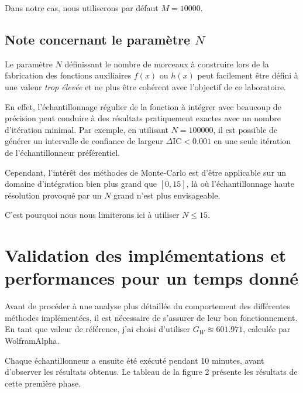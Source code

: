 \documentclass[a4paper,11pt]{article}
\begin{document}
Dans notre cas, nous utiliserons par défaut $M=10000$.

\subsection{Note concernant le paramètre $N$}

Le paramètre $N$ définissant le nombre de morceaux à construire lors de la fabrication des fonctions auxiliaires $f(x)$ ou $h(x)$ peut facilement être défini à une valeur \emph{trop élevée} et ne plus être cohérent avec l'objectif de ce laboratoire.

En effet, l'échantillonnage régulier de la fonction à intégrer avec beaucoup de précision peut conduire à des résultats pratiquement exactes avec un nombre d'itération minimal. Par exemple, en utilisant $N=100000$, il est possible de générer un intervalle de confiance de largeur $\Delta\text{IC} < 0.001$ en une seule itération de l'échantillonneur préférentiel.

Cependant, l'intérêt des méthodes de Monte-Carlo est d'être applicable sur un domaine d'intégration bien plus grand que $[0,15]$, là où l'échantillonnage haute résolution provoqué par un $N$ grand n'est plus envisageable.

C'est pourquoi nous nous limiterons ici à utiliser $N \le 15$.

\section{Validation des implémentations et performances pour un temps donné}

Avant de procéder à une analyse plus détaillée du comportement des différentes méthodes implémentées, il est nécessaire de s'assurer de leur bon fonctionnement. En tant que valeur de référence, j'ai choisi d'utiliser $G_W \approxeq 601.971$, calculée par WolframAlpha.

Chaque échantillonneur a ensuite été exécuté pendant 10 minutes, avant d'observer les résultats obtenus.
Le tableau de la figure 2 présente les résultats de cette première phase.
\end{document}
